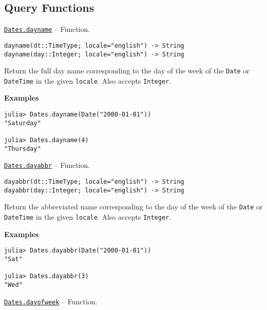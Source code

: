 \hypertarget{11589266561459327415}{}


\subsection{Query Functions}


\hypertarget{2440842966718954493}{} 
\hyperlink{2440842966718954493}{\texttt{Dates.dayname}}  -- {Function.}

\begin{adjustwidth}{2em}{0pt}


\begin{verbatim}
dayname(dt::TimeType; locale="english") -> String
dayname(day::Integer; locale="english") -> String
\end{verbatim}

Return the full day name corresponding to the day of the week of the \texttt{Date} or \texttt{DateTime} in the given \texttt{locale}. Also accepts \texttt{Integer}.

\textbf{Examples}


\begin{verbatim}
julia> Dates.dayname(Date("2000-01-01"))
"Saturday"

julia> Dates.dayname(4)
"Thursday"
\end{verbatim}



\end{adjustwidth}
\hypertarget{18198970391837299875}{} 
\hyperlink{18198970391837299875}{\texttt{Dates.dayabbr}}  -- {Function.}

\begin{adjustwidth}{2em}{0pt}


\begin{verbatim}
dayabbr(dt::TimeType; locale="english") -> String
dayabbr(day::Integer; locale="english") -> String
\end{verbatim}

Return the abbreviated name corresponding to the day of the week of the \texttt{Date} or \texttt{DateTime} in the given \texttt{locale}. Also accepts \texttt{Integer}.

\textbf{Examples}


\begin{verbatim}
julia> Dates.dayabbr(Date("2000-01-01"))
"Sat"

julia> Dates.dayabbr(3)
"Wed"
\end{verbatim}



\end{adjustwidth}
\hypertarget{12798531608759474645}{} 
\hyperlink{12798531608759474645}{\texttt{Dates.dayofweek}}  -- {Function.}

